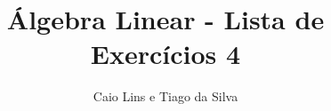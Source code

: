 \documentclass[leqno]{article}
\begin{document}
\newtheorem*{prop*}{Proposição}
\newtheorem{lema}[teo]{Lemma} \newtheorem*{lema*}{Lema}
\newtheorem*{cor*}{Corolário}

\theoremstyle{definition}
\newtheorem{defi}[teo]{Definição} \newtheorem*{defi*}{Definição}
\newtheorem{exem}[teo]{Exemplo} \newtheorem*{exem*}{Exemplo}
\newtheorem{obs}[teo]{Observação} \newtheorem*{obs*}{Observação}
\newtheorem*{hipo}{Hipóteses}
\newtheorem*{nota}{Notação}

\newcommand{\ds}{\displaystyle} \newcommand{\nl}{\newline}
\newcommand{\eps}{\varepsilon} \newcommand{\ssty}{\scriptstyle}
\newcommand{\bE}{\mathbb{E}}
\newcommand{\cB}{\mathcal{B}}
\newcommand{\cF}{\mathcal{F}}
\newcommand{\cA}{\mathcal{A}}
\newcommand{\cM}{\mathcal{M}}
\newcommand{\cD}{\mathcal{D}}
\newcommand{\cN}{\mathcal{N}}
\newcommand{\cL}{\mathcal{L}}
\newcommand{\cLN}{\mathcal{LN}}
\newcommand{\bP}{\mathbb{P}}
\newcommand{\bQ}{\mathbb{Q}}
\newcommand{\bN}{\mathbb{N}}
\newcommand{\R}{\mathbb{R}}
\newcommand{\bZ}{\mathbb{Z}}

\DeclarePairedDelimiter{\dotprod}{\langle}{\rangle} 
\newcommand{\defeq}{\vcentcolon=}
\newcommand{\bfw}{\mathbf{w}}
\newcommand{\bfv}{\mathbf{v}}
\newcommand{\bfu}{\mathbf{u}}

\newcommand{\bvecc}[2]{%
    \begin{bmatrix} #1 \\ #2  \end{bmatrix}
}
\newcommand{\bveccc}[3]{%
    \begin{bmatrix} #1 \\ #2 \\ #3  \end{bmatrix}
}

\newenvironment{sol}
{
    \vspace{4mm}
    \noindent\textbf{Resolução:}
    \strut\newline
    \smallskip
    \hspace{-3.5mm}
}
{} 

\title{Álgebra Linear - Lista de Exercícios 4}

\author{Caio Lins e Tiago da Silva}

\date{}

\maketitle
\end{document}
